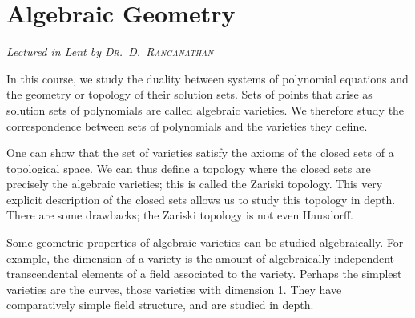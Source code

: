 \chapter[Algebraic Geometry \\ \textnormal{\emph{Lectured in Lent \oldstylenums{2023} by \textsc{Dr.\ D.\ Ranganathan}}}]{Algebraic Geometry}
\emph{\Large Lectured in Lent  by \textsc{Dr.\ D.\ Ranganathan}}

In this course, we study the duality between systems of polynomial equations and the geometry or topology of their solution sets.
Sets of points that arise as solution sets of polynomials are called algebraic varieties.
We therefore study the correspondence between sets of polynomials and the varieties they define.

One can show that the set of varieties satisfy the axioms of the closed sets of a topological space.
We can thus define a topology where the closed sets are precisely the algebraic varieties; this is called the Zariski topology.
This very explicit description of the closed sets allows us to study this topology in depth.
There are some drawbacks; the Zariski topology is not even Hausdorff.

Some geometric properties of algebraic varieties can be studied algebraically.
For example, the dimension of a variety is the amount of algebraically independent transcendental elements of a field associated to the variety.
Perhaps the simplest varieties are the curves, those varieties with dimension 1.
They have comparatively simple field structure, and are studied in depth.


